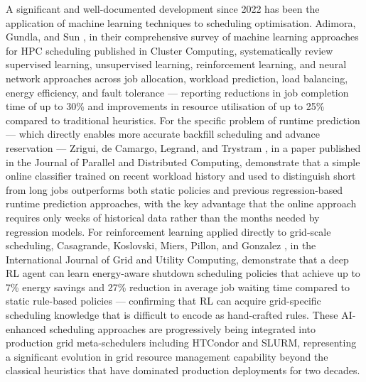 \documentclass[12pt,a4paper]{report}
\begin{document}
A significant and well-documented development since 2022 has been the application of machine learning techniques to scheduling optimisation. Adimora, 
Gundla, and Sun \parencite{adimora2025hpc}, in their comprehensive survey of machine learning approaches for HPC scheduling published in Cluster Computing, systematically 
review supervised learning, unsupervised learning, reinforcement learning, and neural network approaches across job allocation, workload prediction,
 load balancing, energy efficiency, and fault tolerance — reporting reductions in job completion time of up to 30\% and improvements in resource 
 utilisation of up to 25\% compared to traditional heuristics. For the specific problem of runtime prediction — which directly enables more accurate 
 backfill scheduling and advance reservation — Zrigui, de Camargo, Legrand, and Trystram \parencite{zrigui2022online}, in a paper published in the Journal of Parallel and
  Distributed Computing, demonstrate that a simple online classifier trained on recent workload history and used to distinguish short from long jobs 
  outperforms both static policies and previous regression-based runtime prediction approaches, with the key advantage that the online approach requires 
  only weeks of historical data rather than the months needed by regression models. For reinforcement learning applied directly to grid-scale scheduling,
   Casagrande, Koslovski, Miers, Pillon, and Gonzalez \parencite{casagrande2022green}, in the International Journal of Grid and Utility Computing, demonstrate that a deep RL
    agent can learn energy-aware shutdown scheduling policies that achieve up to 7\% energy savings and 27\% reduction in average job waiting time
     compared to static rule-based policies — confirming that RL can acquire grid-specific scheduling knowledge that is difficult to encode as
      hand-crafted rules. These AI-enhanced scheduling approaches are progressively being integrated into production grid meta-schedulers including 
      HTCondor and SLURM, representing a significant evolution in grid resource management capability beyond the classical heuristics that have dominated 
      production deployments for two decades.
\end{document}
